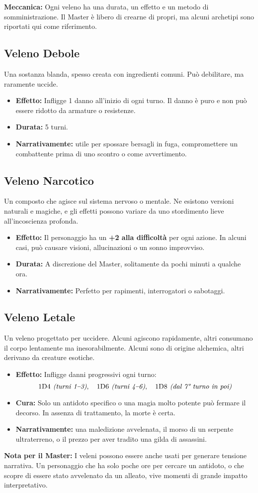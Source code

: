 \documentclass[../manuale_main.tex]{subfiles}
\begin{document}
\textbf{Meccanica:} Ogni veleno ha una durata, un effetto e un metodo di somministrazione. Il Master è libero di crearne di propri, ma alcuni archetipi sono riportati qui come riferimento.

\subsection*{Veleno Debole}
Una sostanza blanda, spesso creata con ingredienti comuni. Può debilitare, ma raramente uccide.

\begin{itemize}
\item \textbf{Effetto:} Infligge 1 danno all’inizio di ogni turno. Il danno è puro e non può essere ridotto da armature o resistenze.
\item \textbf{Durata:} 5 turni.
\item \textbf{Narrativamente:} utile per spossare bersagli in fuga, compromettere un combattente prima di uno scontro o come avvertimento.
\end{itemize}

\subsection*{Veleno Narcotico}
Un composto che agisce sul sistema nervoso o mentale. Ne esistono versioni naturali e magiche, e gli effetti possono variare da uno stordimento lieve all’incoscienza profonda.

\begin{itemize}
\item \textbf{Effetto:} Il personaggio ha un \textbf{+2 alla difficoltà} per ogni azione. In alcuni casi, può causare visioni, allucinazioni o un sonno improvviso.
\item \textbf{Durata:} A discrezione del Master, solitamente da pochi minuti a qualche ora.
\item \textbf{Narrativamente:} Perfetto per rapimenti, interrogatori o sabotaggi.
\end{itemize}

\subsection*{Veleno Letale}
Un veleno progettato per uccidere. Alcuni agiscono rapidamente, altri consumano il corpo lentamente ma inesorabilmente. Alcuni sono di origine alchemica, altri derivano da creature esotiche.

\begin{itemize}
\item \textbf{Effetto:} Infligge danni progressivi ogni turno: 
\[
\textnormal{1D4} \textit{ (turni 1–3)}, \quad \textnormal{1D6} \textit{ (turni 4–6)}, \quad \textnormal{1D8} \textit{ (dal 7° turno in poi)}
\]
\item \textbf{Cura:} Solo un antidoto specifico o una magia molto potente può fermare il decorso. In assenza di trattamento, la morte è certa.
\item \textbf{Narrativamente:} una maledizione avvelenata, il morso di un serpente ultraterreno, o il prezzo per aver tradito una gilda di assassini.
\end{itemize}

\textbf{Nota per il Master:} I veleni possono essere anche usati per generare tensione narrativa. Un personaggio che ha solo poche ore per cercare un antidoto, o che scopre di essere stato avvelenato da un alleato, vive momenti di grande impatto interpretativo.
\end{document}

